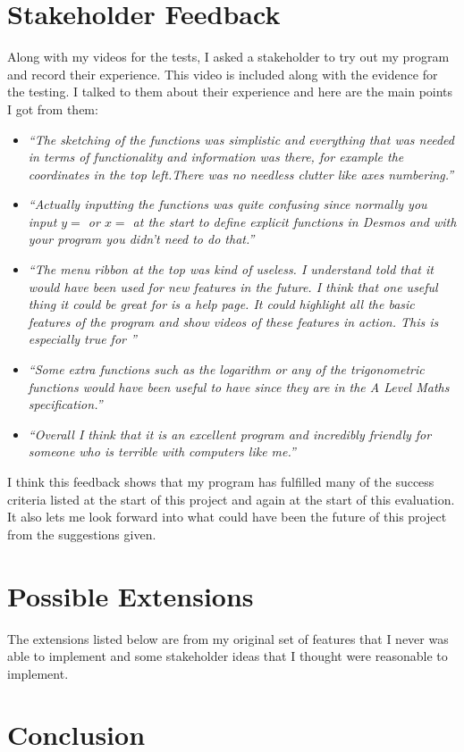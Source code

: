 \documentclass[../../../main.tex]{subfiles}
\begin{document}
\section{Stakeholder Feedback}%
Along with my videos for the tests, I asked a stakeholder to try out my program and record their experience. This video is included along with the evidence for the testing. I talked to them about their experience and here are the main points I got from them:
\begin{itemize}
	\item \textit{``The sketching of the functions was simplistic and everything that was needed in terms of functionality and information was there, for example the coordinates in the top left.There was no needless clutter like axes numbering.''}
	
	\item \textit{``Actually inputting the functions was quite confusing since normally you input $y=$ or $x=$ at the start to define explicit functions in Desmos and with your program you didn't need to do that.''}
	
	\item \textit{``The menu ribbon at the top was kind of useless. I understand told that it would have been used for new features in the future. I think that one useful thing it could be great for is a help page. It could highlight all the basic features of the program and show videos of these features in action. This is especially true for ''}
	
	\item \textit{``Some extra functions such as the logarithm or any of the trigonometric functions would have been useful to have since they are in the A Level Maths specification.''}
	
	\item \textit{``Overall I think that it is an excellent program and incredibly friendly for someone who is terrible with computers like me.''}
\end{itemize}

I think this feedback shows that my program has fulfilled many of the success criteria listed at the start of this project and again at the start of this evaluation. It also lets me look forward into what could have been the future of this project from the suggestions given.

\section{Possible Extensions}
The extensions listed below are from my original set of features that I never was able to implement and some stakeholder ideas that I thought were reasonable to implement.

\section{Conclusion}

\newpage
\end{document}

